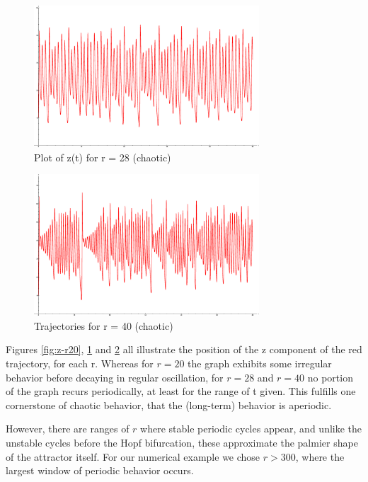 \documentclass{report}
\begin{document}
\begin{figure}[ht]
  \centering
  \includegraphics[width=0.75\textwidth]{z-r28.eps}
  \caption{Plot of z(t) for r = 28 (chaotic)}
  \label{fig:z-r28}
\end{figure}

\begin{figure}[ht]
  \centering
  \includegraphics[width=0.75\textwidth]{z-r40.eps}
  \caption{Trajectories for r = 40 (chaotic)}
  \label{fig:z-r40}
\end{figure}

Figures \ref{fig:z-r20}, \ref{fig:z-r28} and \ref{fig:z-r40} all illustrate the
position of the z component of the red trajectory, for each r. Whereas for
\(r=20\) the graph exhibits some irregular behavior before decaying in regular
oscillation, for \(r=28\) and \(r=40\) no portion of the graph recurs
periodically, at least for the range of t given. This fulfills one cornerstone
of chaotic behavior, that the (long-term) behavior is aperiodic.

However, there are ranges of \(r\) where stable periodic cycles appear, and
unlike the unstable cycles before the Hopf bifurcation, these approximate the
palmier shape of the attractor itself. For our numerical example we chose
\(r > 300\), where the largest window of periodic behavior occurs.
\end{document}
